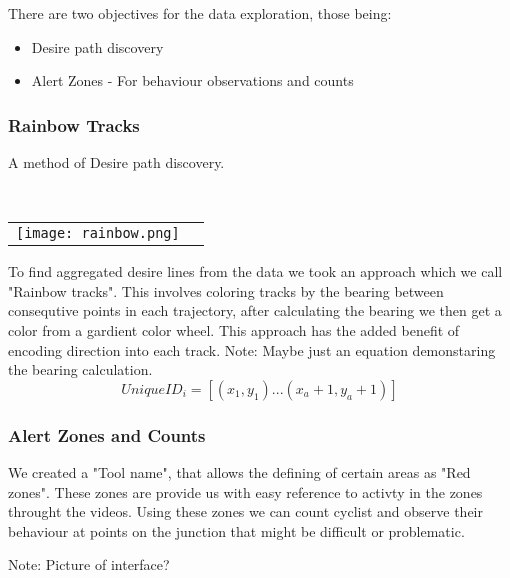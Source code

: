 There are two objectives for the data exploration, those being:
\begin{itemize}
	\item Desire path discovery
	\item Alert Zones - For behaviour observations and counts
\end{itemize}

\subsubsection{Rainbow Tracks}

A method of Desire path discovery.

\ \\ 
\noindent
\begin{tabular}{@{}cc}
\texttt{[image: rainbow.png]} 
\end{tabular}
\label{Rainbow}

To find aggregated desire lines from the data we took an approach which we call "Rainbow tracks". This involves coloring tracks by the bearing between consequtive points in each 
trajectory, after calculating the bearing we then get a color from a gardient color wheel. This approach has the added benefit of encoding direction into 
each track.
Note: Maybe just an equation demonstaring the bearing calculation.
\ \\ 
\begin{equation}
  UniqueID_i = [(x_1, y_1)...(x_a+1, y_a+1)]\label{eq:3}
\end{equation}

\subsubsection{Alert Zones and Counts}

We created a "Tool name", that allows the defining of certain areas as "Red zones". These zones are provide us with easy reference to activty in the zones throught the videos.
Using these zones we can count cyclist and observe their behaviour at points on the junction that might be difficult or
problematic.

Note: Picture of interface?
